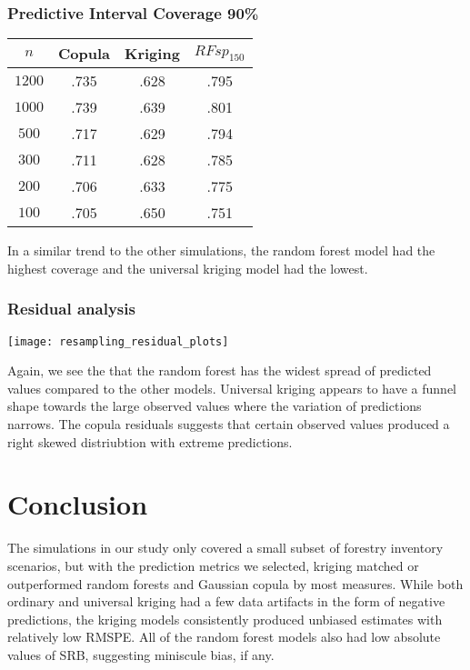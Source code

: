 \documentclass{article}
\begin{document}
\subsubsection{Predictive Interval Coverage 90\%}
\begin{center}
\begin{tabular}{|| c | c c c ||}
\hline
$n$ & Copula & Kriging & $RFsp_{150}$ \\ [.5ex] 
\hline\hline
	$1200$ & .735 & .628 & .795 \\
	$1000$ & .739 & .639 & .801 \\
	$500$ & .717 & .629 & .794 \\
	$300$ & .711 & .628 & .785 \\
	$200$ & .706 & .633 & .775 \\
	$100$ & .705 & .650 & .751 \\ [.5ex] 
\hline
\end{tabular}
\end{center}
In a similar trend to the other simulations, the random forest model had the highest coverage and the universal kriging model had the lowest.

\subsubsection{Residual analysis}
\begin{center}
\texttt{[image: resampling\_residual\_plots]}
\end{center}
Again, we see the that the random forest has the widest spread of predicted values compared to the other models.
Universal kriging appears to have a funnel shape towards the large observed values where the variation of predictions narrows.
The copula residuals suggests that certain observed values produced a right skewed distriubtion with extreme predictions.

\section{Conclusion}
The simulations in our study only covered a small subset of forestry inventory scenarios, but with the prediction metrics we selected, kriging matched or outperformed random forests and Gaussian copula by most measures.
While both ordinary and universal kriging had a few data artifacts in the form of negative predictions, the kriging models consistently produced unbiased estimates with relatively low RMSPE.
All of the random forest models also had low absolute values of SRB, suggesting miniscule bias, if any. 
\end{document}
